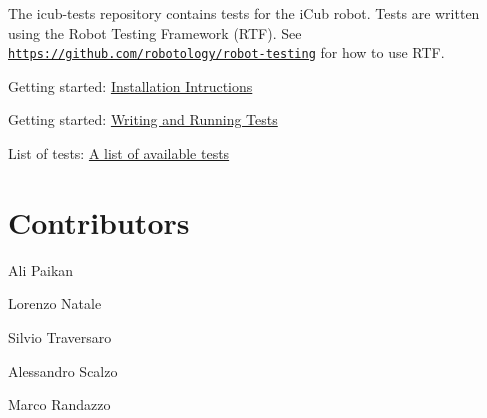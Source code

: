 The {\ttfamily icub-\/tests} repository contains tests for the i\-Cub robot. Tests are written using the Robot Testing Framework (R\-T\-F). See \href{https://github.com/robotology/robot-testing}{\tt https\-://github.\-com/robotology/robot-\/testing} for how to use R\-T\-F.

\begin{DoxyItemize}
\item Getting started\-: \hyperlink{installation}{Installation Intructions} \item Getting started\-: \hyperlink{writing-and-running}{Writing and Running Tests} \item List of tests\-: \hyperlink{group__icub-tests}{A list of available tests}\end{DoxyItemize}
\hypertarget{index_contributors}{}\section{Contributors}\label{index_contributors}
\begin{DoxyItemize}
\item Ali Paikan \item Lorenzo Natale \item Silvio Traversaro \item Alessandro Scalzo \item Marco Randazzo \end{DoxyItemize}

